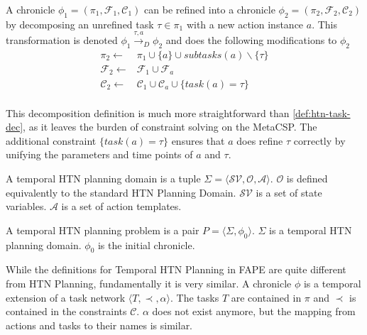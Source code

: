 \begin{definition}
  A chronicle $\phi_1 = (\pi_1,\mathcal{F}_1,\mathcal{C}_1)$ can be refined into a chronicle $\phi_2 = (\pi_2,\mathcal{F}_2,\mathcal{C}_2)$ by decomposing an unrefined task $\tau \in \pi_1$ with a new action instance $a$. This transformation is denoted $\phi_1 \xrightarrow{\tau,a}_D \phi_2$ and does the following modifications to $\phi_2$
  \begin{align*}
    \pi_2 \leftarrow & \pi_1 \cup \{a\} \cup subtasks(a) \backslash \{\tau\} \\
    \mathcal{F}_2 \leftarrow & \mathcal{F}_1 \cup \mathcal{F}_a \\
    \mathcal{C}_2 \leftarrow & \mathcal{C}_1 \cup \mathcal{C}_a \cup \{task(a) = \tau\} \\
  \end{align*}
  \label{def:htn-task-dec-fape}
\end{definition}

This decomposition definition is much more straightforward than \ref{def:htn-task-dec}, as it leaves the burden of constraint solving on the MetaCSP.
The additional constraint $\{task(a) = \tau\}$ ensures that $a$ does refine $\tau$ correctly by unifying the parameters and time points of $a$ and $\tau$.

\begin{definition}
  A temporal HTN planning domain is a tuple $\Sigma = \langle \mathcal{SV},\mathcal{O},\mathcal{A} \rangle$.
  $\mathcal{O}$ is defined equivalently to the standard HTN Planning Domain.
  $\mathcal{SV}$ is a set of state variables.
  $\mathcal{A}$ is a set of action templates.
\end{definition}

\begin{definition}
  A temporal HTN planning problem is a pair $P = \langle \Sigma, \phi_0 \rangle$.
  $\Sigma$ is a temporal HTN planning domain.
  $\phi_0$ is the initial chronicle.
\end{definition}

While the definitions for Temporal HTN Planning in FAPE are quite different from HTN Planning, fundamentally it is very similar.
A chronicle $\phi$ is a temporal extension of a task network $\langle T,\prec,\alpha \rangle$.
The tasks $T$ are contained in $\pi$ and $\prec$ is contained in the constraints $\mathcal{C}$.
$\alpha$ does not exist anymore, but the mapping from actions and tasks to their names is similar.


